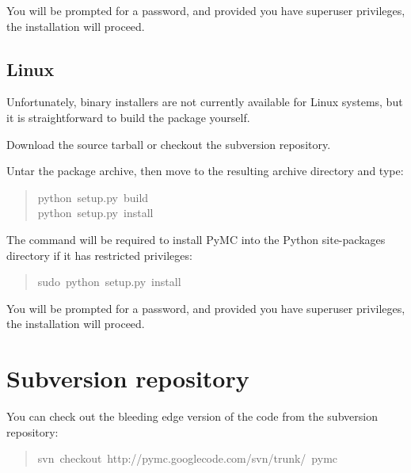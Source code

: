 You will be prompted for a  password, and provided you have superuser privileges,
the installation will proceed.



\hypertarget{linux}{}
\subsection*{Linux}
\label{linux}

Unfortunately, binary installers are not currently available for Linux systems,
but it is straightforward to build the package yourself.
\setcounter{listcnt0}{0}
\begin{list}{.}
{
\setlength{\rightmargin}{\leftmargin}
}
\item {} 
Download the source tarball or checkout the subversion repository.

\item {} 
Untar the package archive, then move to the resulting archive directory and type:
\begin{quote}{\ttfamily \raggedright \noindent
python~setup.py~build~\\
python~setup.py~install
}\end{quote}

\end{list}

The  command will be required to install PyMC into the Python site-packages
directory if it has restricted privileges:
\begin{quote}{\ttfamily \raggedright \noindent
sudo~python~setup.py~install
}\end{quote}

You will be prompted for a  password, and provided you have superuser privileges,
the installation will proceed.



\hypertarget{subversion-repository}{}
\section*{Subversion repository}
\label{subversion-repository}

You can check out the bleeding edge version of the code from the subversion
repository:
\begin{quote}{\ttfamily \raggedright \noindent
svn~checkout~http://pymc.googlecode.com/svn/trunk/~pymc
}\end{quote}


